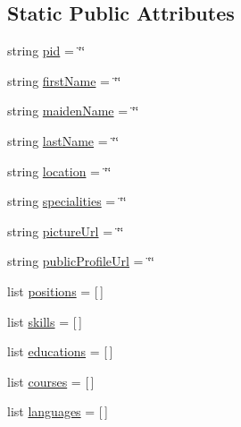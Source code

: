 \subsection*{Static Public Attributes}
\begin{DoxyCompactItemize}
\item 
string \hyperlink{classstudents_1_1linkedin__converter_1_1_person_a65beb2ae251f6c6e654ad25792281894}{pid} = \char`\"{}\char`\"{}
\item 
string \hyperlink{classstudents_1_1linkedin__converter_1_1_person_a35d5d60ceec03ba305e8a189db380ac2}{first\-Name} = \char`\"{}\char`\"{}
\item 
string \hyperlink{classstudents_1_1linkedin__converter_1_1_person_a3df0a3de068edad635f12d079457eb6b}{maiden\-Name} = \char`\"{}\char`\"{}
\item 
string \hyperlink{classstudents_1_1linkedin__converter_1_1_person_a2d040eac8e8b47f0e6c38b0bfab76b55}{last\-Name} = \char`\"{}\char`\"{}
\item 
string \hyperlink{classstudents_1_1linkedin__converter_1_1_person_acfa2c2248119cc7a9ffac6d4b96bc57b}{location} = \char`\"{}\char`\"{}
\item 
string \hyperlink{classstudents_1_1linkedin__converter_1_1_person_acd8938604a06b662b9b1445ccf359755}{specialities} = \char`\"{}\char`\"{}
\item 
string \hyperlink{classstudents_1_1linkedin__converter_1_1_person_a63b0f5ecae1b9140534919b8fc603e81}{picture\-Url} = \char`\"{}\char`\"{}
\item 
string \hyperlink{classstudents_1_1linkedin__converter_1_1_person_aea14e8c81d34be3e77329b05de1a24b1}{public\-Profile\-Url} = \char`\"{}\char`\"{}
\item 
list \hyperlink{classstudents_1_1linkedin__converter_1_1_person_a1b395c681cf806d60dc98eaf3a3d9f8d}{positions} = \mbox{[}$\,$\mbox{]}
\item 
list \hyperlink{classstudents_1_1linkedin__converter_1_1_person_a9e7d26cf8c69ccb6bb34e6c5c8dc0873}{skills} = \mbox{[}$\,$\mbox{]}
\item 
list \hyperlink{classstudents_1_1linkedin__converter_1_1_person_a5cfb1cc9dbb197b1e5452007119a7afd}{educations} = \mbox{[}$\,$\mbox{]}
\item 
list \hyperlink{classstudents_1_1linkedin__converter_1_1_person_ada2e4be2ab676d1723df1ef723ce6ace}{courses} = \mbox{[}$\,$\mbox{]}
\item 
list \hyperlink{classstudents_1_1linkedin__converter_1_1_person_a564e0fd67ce9e7d2fe1c77badcd54575}{languages} = \mbox{[}$\,$\mbox{]}
\end{DoxyCompactItemize}


